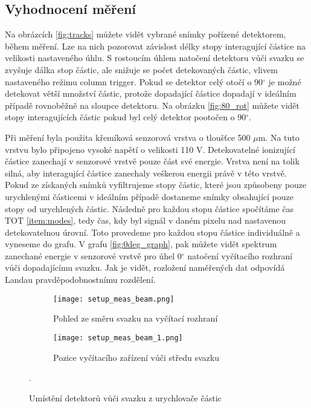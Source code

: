 \subsection{Vyhodnocení měření}
	Na obrázcích \ref{fig:tracks} můžete vidět vybrané snímky pořízené detektorem, během měření. Lze na nich pozorovat závislost délky stopy interagující částice na velikosti nastaveného úhlu. S rostoucím úhlem natočení detektoru vůči svazku se zvyšuje dálka stop částic, ale snižuje se počet detekovaných částic, vlivem nastaveného režimu column trigger. Pokud se detektor celý otočí o 90$^{\circ}$ je možné detekovat větší množství částic, protože dopadající částice dopadají v ideálním případě rovnoběžně na sloupce detektoru. Na obrázku \ref{fig:80_rot} můžete vidět stopy interagujících částic pokud byl celý detektor pootočen o 90$^{\circ}$.
	
	\par
	Při měření byla použita křemíková senzorová vrstva o tloušťce 500 $\mu$m. Na tuto vrstvu bylo připojeno vysoké napětí o velikosti 110 V. Detekovatelné ionizující částice zanechají v senzorové vrstvě pouze část své energie. Vrstva není na tolik silná, aby interagující částice zanechaly veškerou energii právě v této vrstvě. Pokud ze získaných snímků vyfiltrujeme stopy částic, které jsou způsobeny pouze urychlenými částicemi v ideálním případě dostaneme snímky obsahující pouze stopy od urychlených částic. Následně pro každou stopu částice spočítáme čas TOT \ref{item:modes}, tedy čas, kdy byl signál v daném pixelu nad nastavenou detekovatelnou úrovní. Toto provedeme pro každou stopu částice individuálně a vyneseme do grafu. V grafu \ref{fig:0deg_graph}, pak můžete vidět spektrum zanechané energie v senzorové vrstvě pro úhel 0$^{\circ}$ natočení vyčítacího rozhraní vůči dopadajícímu svazku. Jak je vidět, rozložení naměřených dat odpovídá Landau pravděpodobnostnímu rozdělení. %
	
	\begin{figure}[h!]
		\captionsetup{justification=centering}
		\begin{subfigure}{0.5\textwidth}
			\centering
			\texttt{[image: setup\_meas\_beam.png]}
			\caption{Pohled ze směru svazku na vyčítací rozhraní}
			\label{fig:setup_meas_beam}
		\end{subfigure}
		\begin{subfigure}{0.5\textwidth}
			\centering
			\texttt{[image: setup\_meas\_beam\_1.png]}
			\caption{Pozice vyčítacího zařízení vůči středu svazku}
			\label{fig:setup_meas_beam_1}
		\end{subfigure}
		\caption{Umístění detektorů vůči svazku z urychlovače částic}. %
		\label{fig:setum_beam}
	\end{figure}
	
